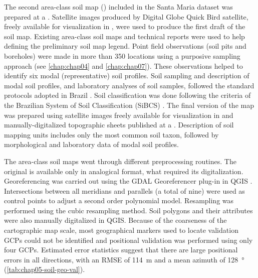The second area-class soil map (\soilNew) included in the Santa Maria dataset \cite{Miguel2010} was prepared 
at a . Satellite images produced by Digital Globe\textregistered{} Quick Bird satellite, freely 
available for visualization in \googleearth, were used to produce the first draft of the soil 
map. Existing area-class soil maps and technical reports \cite{Pedron2005, Poelking2007, Sturmer2008} were 
used to help defining the preliminary soil map legend. Point field observations (soil pits and boreholes) were 
made in 
more than \num{350} locations using a purposive sampling approach (see \autoref{chap:chap04} and 
\autoref{chap:chap07}). These observations helped to identify six modal (representative) soil profiles. Soil 
sampling and description of modal soil profiles, and laboratory analyses of soil samples, followed the standard 
protocols adopted in Brazil \cite{ClaessenEtAl1997, 
SantosEtAl2005}. Soil classification was done following the criteria of the Brazilian System of Soil 
Classification (SiBCS) \cite{SantosEtAl2006}. The final version of the map was prepared using satellite images 
freely available for visualization in \googleearth{} and manually-digitalized topographic sheets 
published at a  \cite{DSG1992a, DSG1992}. Description of soil mapping units includes only the 
most common soil taxon, followed by morphological and laboratory data of modal soil profiles.

The area-class soil maps went through different preprocessing routines. The original \soilOld{} is available 
only in analogical format, what required its digitalization. Georeferencing was carried out using the GDAL 
Georeferencer plug-in in QGIS \cite{GDAL2013, QGIS2013}. Intersections between all meridians and parallels (a 
total of nine) were used as control points to adjust a second order polynomial model. Resampling was performed 
using the cubic resampling method. Soil polygons and their attributes were also manually digitalized in QGIS. 
Because of the coarseness of the cartographic map scale, most geographical markers used to locate validation 
GCPs could not be identified and positional validation was performed using only four GCPs. Estimated error 
statistics suggest that there are large positional errors in all directions, with an RMSE of \SI{114}{\m} and 
a mean azimuth of \SI{128}{\degree} (\autoref{tab:chap05-soil-geo-val}).

